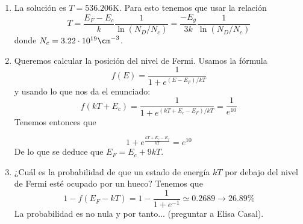 
	\begin{enumerate}[label=\alph*)]
		\item La solución es $T=536.206$K. Para esto tenemos que usar la relación
		      \begin{equation}
			      T = \frac{E_F-E_c}{k} \frac{1}{\ln (N_D/N_c)} =  \frac{-E_g}{3k} \frac{1}{\ln (N_D/N_c)}
		      \end{equation}
		      donde $N_c=3.22\cdot 10^{19}\cm^{-3}$.
		\item Queremos calcular la posición del nivel de Fermi. Usamos la fórmula
		      \begin{equation}
			      f(E) = \frac{1}{1+e^{(E-E_F)/kT}}
		      \end{equation}
		      y usando lo que nos da el enunciado:
		      \begin{equation}
			      f(kT+E_c) = \frac{1}{1+e^{(kT+E_c-E_F)/kT}}
			      = \frac{1}{e^{10}}
		      \end{equation}
		      Tenemos entonces que

		      \begin{equation}
			      1+e^{\frac{kT+E_c-E_f}{kT}} = e^{10}
		      \end{equation}
		      De lo que se deduce que $E_F = E_c + 9kT$.
		\item ¿Cuál es la probabilidad de que un estado de energía \( kT \) por debajo del nivel de Fermi esté ocupado por un hueco? Tenemos que
		      \begin{equation}
			      1-f(E_F-kT) = 1 - \frac{1}{1+e^{-1}} \simeq 0.2689 \rightarrow 26.89 \%
		      \end{equation}
		      La probabilidad es no nula y por tanto... (preguntar a Elisa Casal).
	\end{enumerate}
